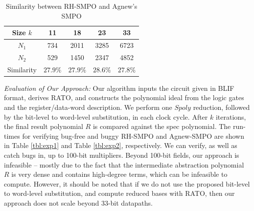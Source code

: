 \begin{table}[htb]
\centering
\caption{\small Similarity between RH-SMPO and Agnew's SMPO}
\label{tbl:fraig}
\begin{tabular}{|c||c|c|c|c|} 
\hline
Size $k$ & 11 & 18 & 23 & 33 \\
\hline
$N_1$ & 734  & 2011  & 3285  & 6723\\
\hline
$N_2$ & 529 & 1450 & 2347 & 4852\\
\hline
Similarity & $27.9\%$ & $27.9\%$ & $28.6\%$ & $27.8\%$  \\
\hline
\end{tabular}\label{table:similarity}  
\end{table} 

{\it Evaluation of Our Approach:} Our algorithm inputs the circuit
given in BLIF format, derives RATO, and constructs the polynomial
ideal from the logic gates and the register/data-word description.  We
perform one $Spoly$ reduction, followed by the bit-level to word-level 
substitution, in each clock cycle. After $k$ iterations, the final
result polynomial $R$ is compared against the spec polynomial. The
run-times for verifying bug-free and buggy RH-SMPO and Agnew-SMPO are
shown in Table \ref{tbl:exp1} and Table \ref{tbl:exp2}, respectively. 
We can verify, as well as catch bugs in, up to 100-bit
multipliers. Beyond 100-bit fields, our approach is infeasible --
mostly due to the fact that the intermediate 
abstraction polynomial $R$ is very dense and contains high-degree
terms, which can be infeasible to compute. However, it should be noted
that if we do not use the proposed bit-level to word-level
substitution, and compute reduced \Grobner bases with RATO, then our
approach does not scale beyond 33-bit datapaths. 

